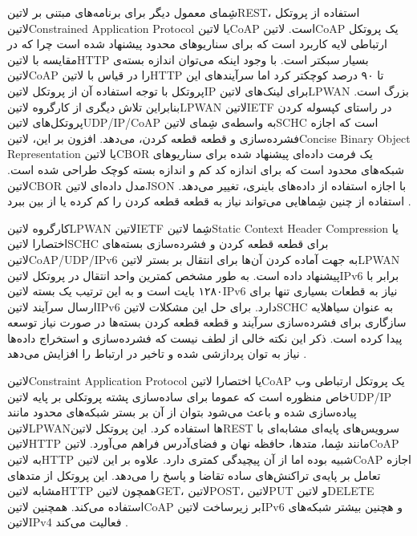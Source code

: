 شِمای معمول دیگر برای برنامه‌های مبتنی بر ‌لاتین{REST}، استفاده از پروتکل ‌لاتین{Constrained Application Protocol} یا ‌لاتین{CoAP}
است. ‌لاتین{CoAP} یک پروتکل ارتباطی لایه کاربرد است که برای سناریوهای محدود پیشنهاد شده است چرا که در مقایسه با ‌لاتین{HTTP}
بسیار سبکتر است.
با وجود اینکه می‌توان اندازه بسته‌ی ‌لاتین{CoAP} را در قیاس با ‌لاتین{HTTP} تا ۹۰ درصد کوچکتر کرد اما سرآیندهای این پروتکل با توجه
استفاده آن از پروتکل ‌لاتین{IP} برای لینک‌های ‌لاتین{LPWAN} بزرگ است.
بنابراین تلاش دیگری از کارگروه ‌لاتین{LPWAN} ‌لاتین{IETF} در راستای کپسوله کردن پروتکل‌های ‌لاتین{UDP/IP/CoAP}
به واسطه‌ی شِمای ‌لاتین{SCHC} است که اجازه فشرده‌سازی و قطعه قطعه کردن، می‌دهد.
افزون بر این، ‌لاتین{Concise Binary Object Representation} یا ‌لاتین{CBOR} یک فرمت داده‌ای پیشنهاد شده برای سناریوهای
شبکه‌های محدود است که برای اندازه کد کم و اندازه بسته کوچک طراحی شده است.
‌لاتین{CBOR} مدل داده‌ای ‌لاتین{JSON} با اجازه استفاده از داده‌های باینری، تغییر می‌دهد.
استفاده از چنین شِماهایی می‌تواند نیاز به قطعه قطعه کردن را کم کرده یا از بین ببرد
.

کارگروه ‌لاتین{LPWAN} ‌لاتین{IETF} شِما ‌لاتین{Static Context Header Compression} یا اختصارا ‌لاتین{SCHC}
برای قطعه قطعه کردن و فشرده‌سازی بسته‌های ‌لاتین{CoAP/UDP/IPv6} به جهت آماده کردن آن‌ها برای انتقال بر بستر ‌لاتین{LPWAN}
پیشنهاد داده است. به طور مشخص کمترین واحد انتقال در پروتکل ‌لاتین{IPv6} برابر با ۱۲۸۰ بایت است و به این ترتیب یک بسته ‌لاتین{IPv6}
نیاز به قطعات بسیاری تنها برای ارسال سرآیند ‌لاتین{IPv6} دارد. برای حل این مشکلات ‌لاتین{SCHC} به عنوان ‌سیاه{لایه سازگاری}
برای فشرده‌سازی سرآیند و قطعه قطعه کردن بسته‌ها در صورت نیاز توسعه پیدا کرده است.
ذکر این نکته خالی از لطف نیست که فشرده‌سازی و استخراج داده‌ها نیاز به توان پردازشی شده و تاخیر در ارتباط را افزایش می‌دهد
.


‌لاتین{Constraint Application Protocol} یا اختصارا ‌لاتین{CoAP}
یک پروتکل ارتباطی وب خاص منظوره است که عموما برای ساده‌سازی پشته پروتکلی بر پایه ‌لاتین{UDP/IP} پیاده‌سازی شده
و باعث می‌شود بتوان از آن بر بستر شبکه‌های محدود مانند ‌لاتین{LPWAN}ها استفاده کرد.
این پروتکل ‌لاتین{REST} سرویس‌های پایه‌ای مشابه‌ای با ‌لاتین{HTTP} مانند شِما، متدها، حافظه نهان و فضای‌آدرس فراهم می‌آورد.
‌لاتین{CoAP} به ‌لاتین{HTTP} شبیه بوده اما از آن پیچیدگی کمتری دارد.
علاوه بر این ‌لاتین{CoAP} اجازه تعامل بر پایه‌ی تراکنش‌های ساده تقاضا و پاسخ را می‌دهد.
این پروتکل از متدهای مشابه ‌لاتین{HTTP} همچون ‌لاتین{GET}، ‌لاتین{POST}، ‌لاتین{PUT} و ‌لاتین{DELETE} استفاده می‌کند.
همچنین ‌لاتین{CoAP} بر زیرساخت ‌لاتین{IPv6} و هچنین بیشتر شبکه‌های ‌لاتین{IPv4} فعالیت می‌کند
.

